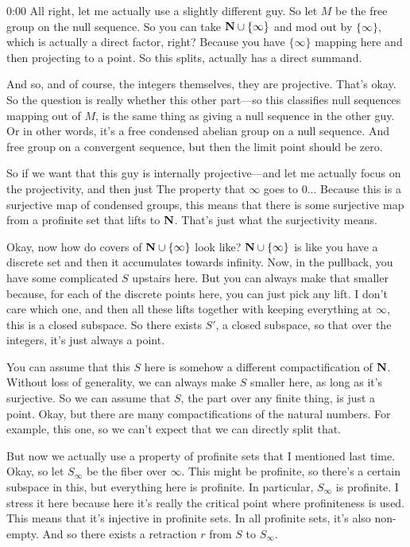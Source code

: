 \begin{unfinished}{0:00}
All right, let me actually use a slightly different guy. So let $M$ be the free group on the null sequence. So you can take $\mathbf N \cup \{\infty\}$ and mod out by $\{\infty\}$, which is actually a direct factor, right? Because you have $\{\infty\}$ mapping here and then projecting to a point. So this splits, actually has a direct summand.

And so, and of course, the integers themselves, they are projective. That's okay. So the question is really whether this other part---so this classifies null sequences mapping out of $M$, is the same thing as giving a null sequence in the other guy. Or in other words, it's a free condensed abelian group on a null sequence. And free group on a convergent sequence, but then the limit point should be zero.

So if we want that this guy is internally projective---and let me actually focus on the projectivity, and then just
The property that $\infty$ goes to $0$... Because this is a surjective map of condensed groups, this means that there is some surjective map from a profinite set that lifts to $\mathbf N$. That's just what the surjectivity means.

Okay, now how do covers of $\mathbf N \cup \{\infty\}$ look like? $\mathbf N \cup \{\infty\}$ is like you have a discrete set and then it accumulates towards infinity. Now, in the pullback, you have some complicated $S$ upstairs here. But you can always make that smaller because, for each of the discrete points here, you can just pick any lift. I don't care which one, and then all these lifts together with keeping everything at $\infty$, this is a closed subspace. So there exists $S'$, a closed subspace, so that over the integers, it's just always a point.

You can assume that this $S$ here is somehow a different compactification of $\mathbf N$. Without loss of generality, we can always make $S$ smaller here, as long as it's surjective. So we can assume that $S$, the part over any finite thing, is just a point. Okay, but there are many compactifications of the natural numbers. For example, this one, so we can't expect that we can directly split that.

But now we actually use a property of profinite sets that I mentioned last time. Okay, so let $S_\infty$ be the fiber over $\infty$. This might be profinite, so there's a certain subspace in this, but everything here is profinite. In particular, $S_\infty$ is profinite. I stress it here because here it's really the critical point where profiniteness is used. This means that it's injective in profinite sets. In all profinite sets, it's also non-empty. And so there exists a retraction $r$ from $S$ to $S_\infty$.


\end{unfinished}
